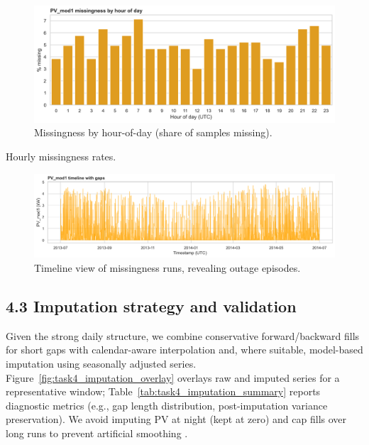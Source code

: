 \documentclass[12pt,a4paper]{article}
\begin{document}
\begin{figure}[H]
  \centering
  \includegraphics[width=0.8\linewidth]{task4_fig_missing_tod.png}
  \caption{Missingness by hour-of-day (share of samples missing).}
  \label{fig:task4_missing_tod}
\end{figure}

\begin{table}[H]
  \centering
  \caption{Hourly missingness rates.}
  \label{tab:task4_missing_tod_tbl}
\end{table}

\begin{figure}[H]
  \centering
  \includegraphics[width=0.95\linewidth]{task4_fig_missing_timeline.png}
  \caption{Timeline view of missingness runs, revealing outage episodes.}
  \label{fig:task4_missing_timeline}
\end{figure}

\subsection*{4.3 Imputation strategy and validation}
Given the strong daily structure, we combine conservative forward/backward fills for short gaps with calendar-aware interpolation and, where suitable, model-based imputation using seasonally adjusted series. Figure~\ref{fig:task4_imputation_overlay} overlays raw and imputed series for a representative window; Table~\ref{tab:task4_imputation_summary} reports diagnostic metrics (e.g., gap length distribution, post-imputation variance preservation). We avoid imputing PV at night (kept at zero) and cap fills over long runs to prevent artificial smoothing \cite{Hyndman2021,Little2002}.
\end{document}
